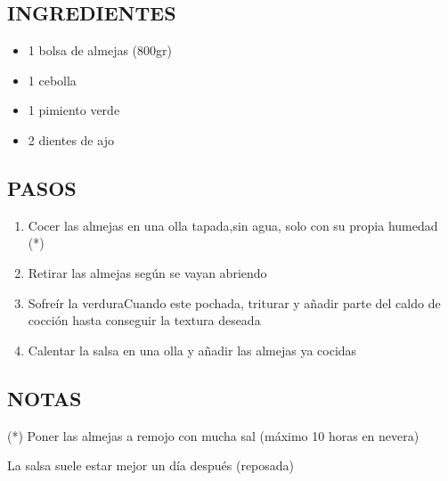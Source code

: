 
\subsection*{INGREDIENTES}
\begin{itemize}
    \item 1 bolsa de almejas (800gr)
    \item 1 cebolla
    \item 1 pimiento verde
    \item 2 dientes de ajo
\end{itemize}

\subsection*{PASOS}
\begin{enumerate}
    \item Cocer las almejas en una olla tapada,sin agua, solo con su propia humedad (*)
    \item Retirar las almejas según se vayan abriendo
    \item Sofreír la verduraCuando este pochada, triturar y añadir parte del caldo de cocción hasta conseguir la textura deseada
    \item Calentar la salsa en una olla y añadir las almejas ya cocidas
\end{enumerate}

\subsection*{NOTAS}
(*) Poner las almejas a remojo con mucha sal (máximo 10 horas en nevera)

La salsa suele estar mejor un día después (reposada)

